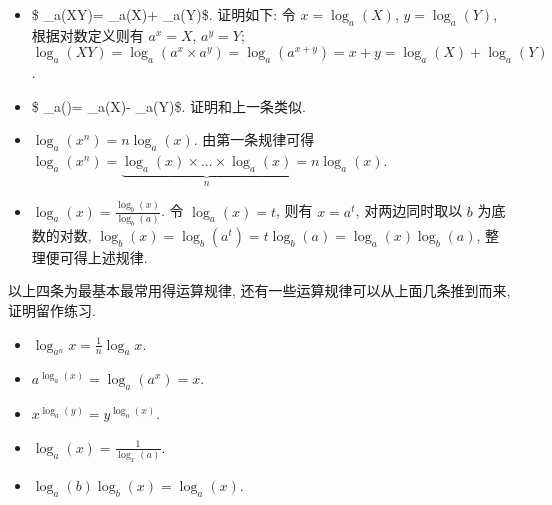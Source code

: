 \begin{itemize}
\tightlist
\item
  \$ \log\_a(XY)= \log\_a(X)+ \log\_a(Y)\$. 证明如下: 令
  \(x=\log_a(X)\), \(y=\log_a(Y)\), 根据对数定义则有 \(a^x=X\),
  \(a^y=Y\);
  \(\log_a(XY)=\log_a(a^x\times a^y)=\log_a(a^{x+y})=x+y=\log_a(X)+ \log_a(Y)\).
\item
  \$ \log\_a\left(\right)= \log\_a(X)- \log\_a(Y)\$.
  证明和上一条类似.
\item
  \(\log_a(x^n)=n\log_a(x)\). 由第一条规律可得
  \(\log_a(x^n)=\underbrace{\log_a(x)\times...\times\log_a(x)}_{n}=n\log_a(x)\).
\item
  \(\log_a(x)=\frac{\log_b(x)}{\log_b(a)}\). 令 \(\log_a(x)=t\), 则有
  \(x=a^t\), 对两边同时取以 \(b\) 为底数的对数,
  \(\log_b(x)=\log_b(a^t)=t\log_b(a)=\log_a(x)\log_b(a)\),
  整理便可得上述规律.
\end{itemize}

以上四条为最基本最常用得运算规律,
还有一些运算规律可以从上面几条推到而来, 证明留作练习.

\begin{itemize}
\tightlist
\item
  \(\log_{a^n}x=\frac{1}{n}\log_{a}x\).
\item
  \(a^{\log_a(x)}=\log_a(a^x)=x\).
\item
  \(x^{\log_a(y)}=y^{\log_a(x)}\).
\item
  \(\log_a(x)=\frac{1}{\log_x(a)}\).
\item
  \(\log_a(b)\log_b(x)=\log_a(x)\).
\end{itemize}
